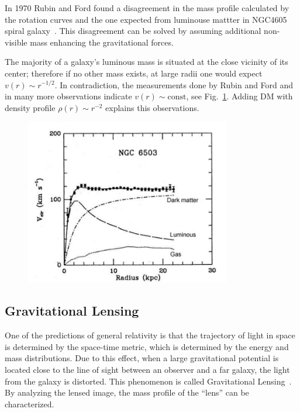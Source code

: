 In 1970 Rubin and Ford found a disagreement in the mass profile calculated by the rotation curves and the one expected from luminouse mattter in NGC4605 spiral galaxy~\cite{Rubin:1970zza}. This disagreement can be solved by assuming additional non-visible mass enhancing the gravitational forces.

The majority of a galaxy's luminous mass is situated at the close vicinity of its center; therefore if no other mass exists, at large radii one would expect $v(r) \sim r^{-1/2}$. In contradiction, the measurements done by Rubin and Ford and in many more observations indicate $v(r) \sim \mathrm{const}$, see Fig.~\ref{fig:RotationCurve}. Adding DM with density profile $\rho(r) \sim r^{-2}$ explains this observations.

 \begin{figure}[]
	\centering
	\includegraphics[width=0.8\textwidth]{figs/rotationCurve6503.png}
	\label{fig:RotationCurve}
\end{figure}  

\subsection{Gravitational Lensing}
  
One of the predictions of general relativity is that the trajectory of light in space is determined by the space-time metric, which is determined by the energy and mass distributions. Due to this effect, when a large gravitational potential is located close to the line of sight between an observer and a far galaxy, the light from the galaxy is distorted. This phenomenon is called Gravitational Lensing~\cite{Bertone:2010zza}. By analyzing the lensed image, the mass profile of the ``lens'' can be characterized.

